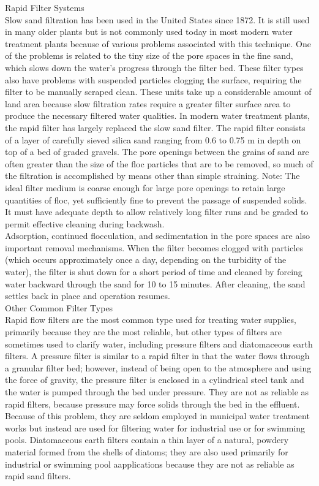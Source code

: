 Rapid Filter Systems\\
Slow sand filtration has been used in the United States since 1872. It is still used in many older plants but is not commonly used today in most modern water treatment plants because of various problems associated with this technique. One of the problems is related to the tiny size of the pore spaces in the fine sand, which slows down the water’s progress through the filter bed. These filter types also have problems with suspended particles clogging the surface, requiring the filter to be manually scraped clean. These units take up a considerable amount of land area because slow filtration rates require a greater filter surface area to produce the necessary filtered water qualities.
In modern water treatment plants, the rapid filter has largely replaced the slow sand filter. The rapid filter consists of a layer of carefully sieved silica sand ranging from 0.6 to 0.75 m in depth on top of a bed of graded gravels. The pore openings between the grains of sand are often greater than the size of the floc particles that are to be removed, so much of the filtration is accomplished by means other than simple straining.
Note: The ideal filter medium is coarse enough for large pore openings to retain large quantities of floc, yet sufficiently fine to prevent the passage of suspended solids. It must have adequate depth to allow relatively long filter runs and be graded to permit effective cleaning during backwash.\\
Adsorption, continued flocculation, and sedimentation in the pore spaces are also important removal mechanisms. When the filter becomes clogged with particles (which occurs approximately once a day, depending on the turbidity of the water), the filter is shut down for a short period of time and cleaned by forcing water backward through the sand for 10 to 15 minutes. After cleaning, the sand settles back in place and operation resumes.\\
Other Common Filter Types\\
Rapid flow filters are the most common type used for treating water supplies, primarily because they are the most reliable, but other types of filters are sometimes used to clarify water, including pressure filters and diatomaceous earth filters. A pressure filter is similar to a rapid filter in that the water flows through a granular filter bed; however, instead of being open to the atmosphere and using the force of gravity, the pressure filter is enclosed in a cylindrical steel tank and the water is pumped through the bed under pressure. They are not as reliable as rapid filters, because pressure may force solids through the bed in the effluent. Because of this problem, they are seldom employed in municipal water treatment works but instead are used for filtering water for industrial use or for swimming pools. Diatomaceous earth filters contain a thin layer of a natural, powdery material formed from the shells of diatoms; they are also used primarily for industrial or swimming pool aapplications because they are not as reliable as rapid sand filters.\\

